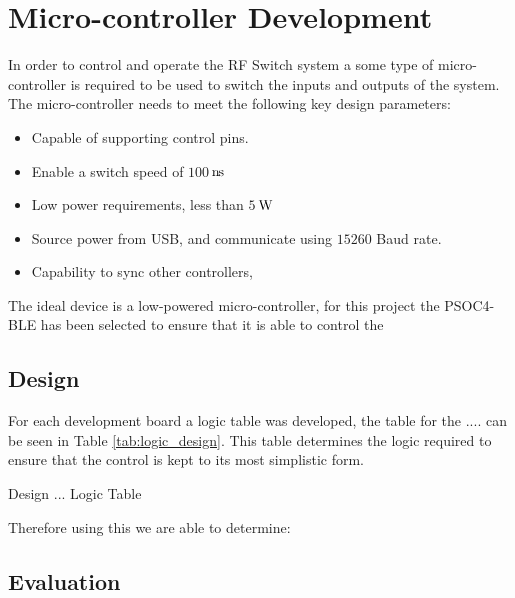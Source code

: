 \documentclass[12pt,openany,a4paper]{book}
\newcommand{\pack}	{\hspace{-0.08em}}
\newcommand{\ns}	{\ensuremath{\rm\,n\pack s}}
\newcommand{\W}		{\ensuremath{\rm\,W}}
\begin{document}
\section{Micro-controller Development}
In order to control and operate the RF Switch system a some type of micro-controller is required to be used to switch the inputs and outputs of the system. The micro-controller needs to meet the following key design parameters:
\begin{itemize}
	\setlength\itemsep{-0.5em}
	\item Capable of supporting \numberofpins control pins.
	\item Enable a switch speed of $100$\ns
	\item Low power requirements, less than $5$\W
	\item Source power from USB, and communicate using $15260$ Baud rate.
	\item Capability to sync other controllers, 
\end{itemize}
The ideal device is a low-powered micro-controller, for this project the PSOC4-BLE has been selected to ensure that it is able to control the 


\subsection{Design}



For each development board a logic table was developed, the table for the .... can be seen in Table \ref{tab:logic_design}. This table determines the logic required to ensure that the control is kept to its most simplistic form.
\begin{table}
	\centering
	\caption{Design ... Logic Table}
	\label{tab:logic_design}
\end{table}
Therefore using this we are able to determine:

\subsection{Evaluation}











\end{document}
